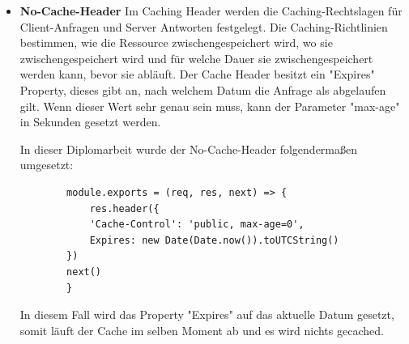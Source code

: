 \begin{itemize}
        \cite{Helmet}
    \item \textbf{No-Cache-Header}
        \newline
        Im Caching Header werden die Caching-Rechtslagen für Client-Anfragen und Server Antworten festgelegt. Die Caching-Richtlinien bestimmen, wie die Ressource zwischengespeichert wird, wo sie zwischengespeichert wird und für welche Dauer sie zwischengespeichert werden kann, bevor sie abläuft. Der Cache Header besitzt ein "Expires" Property, dieses gibt an, nach welchem Datum die Anfrage als abgelaufen gilt. Wenn dieser Wert sehr genau sein muss, kann der Parameter "max-age" in Sekunden gesetzt werden.

        In dieser Diplomarbeit wurde der No-Cache-Header folgendermaßen umgesetzt:

        \begin{lstlisting}
        module.exports = (req, res, next) => {
            res.header({
            'Cache-Control': 'public, max-age=0',
            Expires: new Date(Date.now()).toUTCString()
        })
        next()
        }
        \end{lstlisting}

        In diesem Fall wird das Property "Expires" auf das aktuelle Datum gesetzt, somit läuft der Cache im selben Moment ab und es wird nichts gecached.


        \cite{No_Cache_Header}
        
\end{itemize}